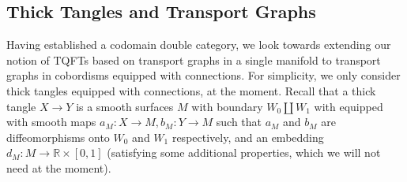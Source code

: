 \documentclass{amsart}
\newcommand{\R}{\mathbb{R}}
\renewcommand{\to}[1][]{\stackrel{#1}{\longrightarrow}}
\numberwithin{thm}{section}
\theoremstyle{definition}
\begin{document}
%

\subsection{Thick Tangles and Transport Graphs}

Having established a codomain double category, we look towards extending our
notion of TQFTs based on transport graphs in a single manifold to transport
graphs in cobordisms equipped with connections. For simplicity, we only consider
thick tangles equipped with connections, at the moment. Recall that a thick
tangle $X \to Y$ is a smooth surfaces $M$ with boundary $W_0 \amalg W_1$ with
equipped with smooth maps $a_M : X \to M, b_M : Y \to M$ such that $a_M$ and
$b_M$ are diffeomorphisms onto $W_0$ and $W_1$ respectively, and an embedding
$d_M : M \to \R \times [0, 1]$ (satisfying some additional properties, which we
will not need at the moment).
\end{document}
